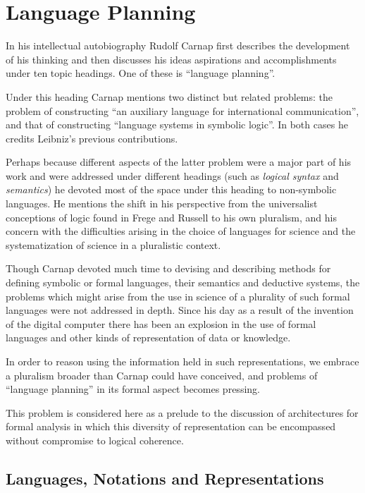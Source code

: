 
\chapter{Language Planning}\label{LanguagePlanning}

In his intellectual autobiography \cite{carnap63} Rudolf Carnap
first describes the development of his thinking and then discusses
his ideas aspirations and accomplishments under ten topic headings.
One of these is ``language planning''.

Under this heading Carnap mentions two distinct but related problems:
the problem of constructing ``an auxiliary language for international
communication'', and that of constructing ``language systems in
symbolic logic''. 
In both cases he credits Leibniz's previous contributions.

Perhaps because different aspects of the latter problem were a major
part of his work and were addressed under different headings (such as
\emph{logical syntax} and \emph{semantics}) he devoted most of the
space under this heading to non-symbolic languages.
He mentions the shift in his perspective from the universalist
conceptions of logic found in Frege and Russell to his own pluralism,
and his concern with the difficulties arising in the choice of
languages for science and the systematization of science in a
pluralistic context. 

Though Carnap devoted much time to devising and describing methods for
defining symbolic or formal languages, their semantics and deductive systems,
the problems which might arise from the use in science of a plurality of
such formal languages were not addressed in depth. 
Since his day as a result of the invention of the digital computer
there has been an explosion in the use of formal languages and other
kinds of representation of data or knowledge.

In order to reason using the information held in such representations,
we embrace a pluralism broader than Carnap could have conceived,
and problems of ``language planning'' in its formal aspect becomes pressing.

This problem is considered here as a prelude to the discussion of
architectures for formal analysis in which this diversity of
representation can be encompassed without compromise to logical
coherence.

\section{Languages, Notations and Representations}

